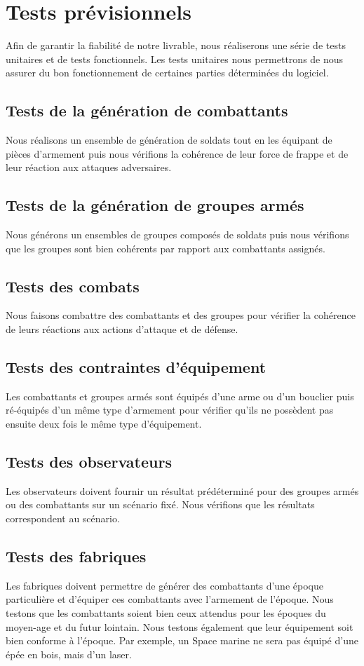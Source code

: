 \section{Tests prévisionnels}

Afin de garantir la fiabilité de notre livrable, nous réaliserons une série de tests unitaires et de tests fonctionnels. Les tests unitaires nous permettrons de nous assurer du bon fonctionnement de certaines parties déterminées du logiciel. 

\subsection{Tests de la génération de combattants}
Nous réalisons un ensemble de génération de soldats tout en les équipant de pièces
d'armement puis nous vérifions la cohérence de leur force de frappe et de leur réaction
aux attaques adversaires.

\subsection{Tests de la génération de groupes armés}
Nous générons un ensembles de groupes composés de soldats puis nous vérifions que les groupes
sont bien cohérents par rapport aux combattants assignés.

\subsection{Tests des combats}
Nous faisons combattre des combattants et des groupes pour vérifier la cohérence de leurs réactions aux actions d'attaque et de défense.

\subsection{Tests des contraintes d'équipement}
Les combattants et groupes armés sont équipés d'une arme ou d'un bouclier puis ré-équipés d'un même type
d'armement pour vérifier qu'ils ne possèdent pas ensuite deux fois le même type d'équipement.

\subsection{Tests des observateurs}
Les observateurs doivent fournir un résultat prédéterminé pour des groupes armés ou des combattants sur
un scénario fixé. Nous vérifions que les résultats correspondent au scénario.

\subsection{Tests des fabriques}
Les fabriques doivent permettre de générer des combattants d'une époque particulière et d'équiper ces combattants
avec l'armement de l'époque. Nous testons que les combattants soient bien ceux attendus pour les époques du
moyen-age et du futur lointain. Nous testons également que leur équipement soit bien conforme à l'époque. Par
exemple, un Space marine ne sera pas équipé d'une épée en bois, mais d'un laser.